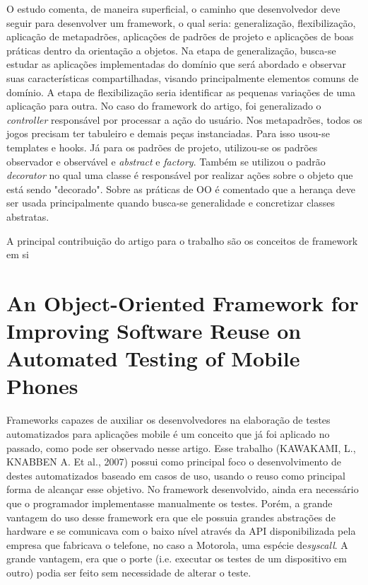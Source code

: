 \documentclass[
    12pt,       %
    openright,      %
    twoside,      %
    a4paper,      %
    english,      %
    french,       %
    spanish,      %
    brazil,       %
    ]{abntex2}
\begin{document}
      O estudo comenta, de maneira superficial, o caminho que desenvolvedor deve seguir para desenvolver um
      framework, o qual seria: generalização, flexibilização, aplicação de metapadrões, aplicações de padrões
      de projeto e aplicações de boas práticas dentro da orientação a objetos.
      Na etapa de generalização, busca-se estudar as aplicações implementadas do domínio que será abordado
      e observar suas características compartilhadas, visando principalmente elementos comuns de domínio. A
      etapa de flexibilização seria identificar as pequenas variações de uma aplicação para outra. No caso do
      framework do artigo, foi generalizado o \textit{controller} responsável por processar a ação do usuário.
      Nos metapadrões, todos os jogos precisam ter tabuleiro e demais peças instanciadas. Para isso usou-se
      templates e hooks. Já para os padrões de projeto, utilizou-se os padrões observador e observável e
      \textit{abstract} e \textit{factory}. Também se utilizou o padrão \textit{decorator} no qual uma
      classe é responsável por realizar ações sobre o objeto que está sendo "decorado". Sobre as práticas
      de OO é comentado que a herança deve ser usada principalmente quando busca-se generalidade e concretizar classes abstratas.

      A principal contribuição do artigo para o trabalho são os conceitos de framework em si

    \section{An Object-Oriented Framework for Improving Software Reuse on Automated Testing of Mobile Phones}
      Frameworks capazes de auxiliar os desenvolvedores na elaboração de testes automatizados para aplicações
      mobile é um conceito que já foi aplicado no passado, como pode ser observado nesse artigo. Esse
      trabalho (KAWAKAMI, L., KNABBEN A. Et al., 2007) possui como principal foco o desenvolvimento de destes
      automatizados baseado em casos de uso, usando o reuso como principal forma de alcançar esse objetivo.
      No framework desenvolvido, ainda era necessário que o programador implementasse manualmente os testes.
      Porém, a grande vantagem do uso desse framework era que ele possuia grandes abstrações de hardware
      e se comunicava com o baixo nível através da API disponibilizada pela empresa que fabricava o
      telefone, no caso a Motorola, uma espécie de\textit{syscall}. A grande vantagem, era que o porte
      (i.e. executar os testes de um dispositivo em outro) podia ser feito sem necessidade de alterar o teste.
\end{document}
